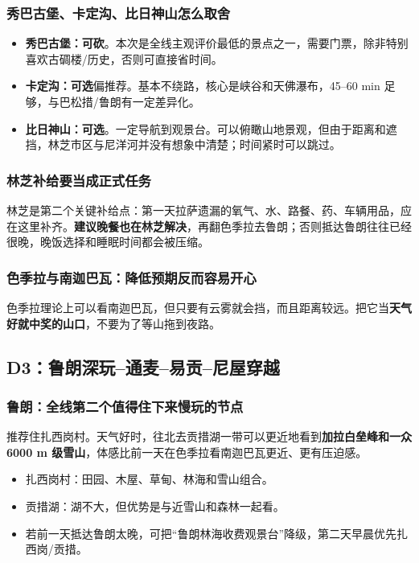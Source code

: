 \documentclass[10.5pt,a4paper]{ctexart}
\newcommand{\tagopt}{\textcolor{blue!70!black}{\textbf{可选}}}
\newcommand{\tagcut}{\textcolor{red!70!black}{\textbf{可砍}}}
\begin{document}
\subsubsection{秀巴古堡、卡定沟、比日神山怎么取舍}
\begin{itemize}
  \item \textbf{秀巴古堡：}\tagcut。本次是全线主观评价最低的景点之一，需要门票，除非特别喜欢古碉楼/历史，否则可直接省时间。
  \item \textbf{卡定沟：}\tagopt 偏推荐。基本不绕路，核心是峡谷和天佛瀑布，45--60 min 足够，与巴松措/鲁朗有一定差异化。
  \item \textbf{比日神山：}\tagopt。一定导航到观景台。可以俯瞰山地景观，但由于距离和遮挡，林芝市区与尼洋河并没有想象中清楚；时间紧时可以跳过。
\end{itemize}

\subsubsection{林芝补给要当成正式任务}
林芝是第二个关键补给点：第一天拉萨遗漏的氧气、水、路餐、药、车辆用品，应在这里补齐。\textbf{建议晚餐也在林芝解决}，再翻色季拉去鲁朗；否则抵达鲁朗往往已经很晚，晚饭选择和睡眠时间都会被压缩。

\subsubsection{色季拉与南迦巴瓦：降低预期反而容易开心}
色季拉理论上可以看南迦巴瓦，但只要有云雾就会挡，而且距离较远。把它当\textbf{天气好就中奖的山口}，不要为了等山拖到夜路。

\subsection{D3：鲁朗深玩--通麦--易贡--尼屋穿越}

\subsubsection{鲁朗：全线第二个值得住下来慢玩的节点}
推荐住扎西岗村。天气好时，往北去贡措湖一带可以更近地看到\textbf{加拉白垒峰和一众 6000 m 级雪山}，体感比前一天在色季拉看南迦巴瓦更近、更有压迫感。

\begin{itemize}
  \item 扎西岗村：田园、木屋、草甸、林海和雪山组合。
  \item 贡措湖：湖不大，但优势是与近雪山和森林一起看。
  \item 若前一天抵达鲁朗太晚，可把“鲁朗林海收费观景台”降级，第二天早晨优先扎西岗/贡措。
\end{itemize}
\end{document}
